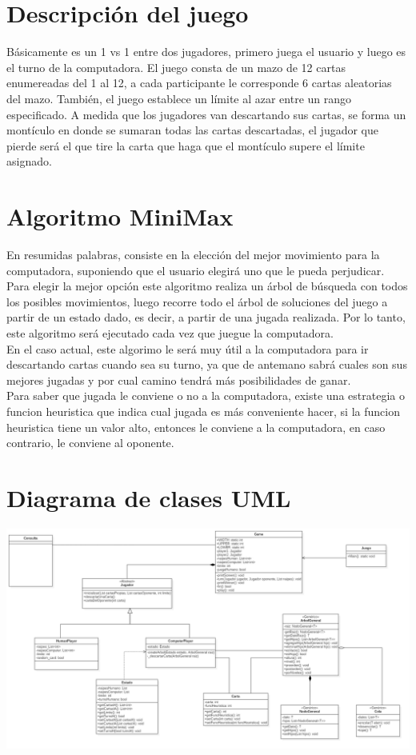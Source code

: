 \documentclass[12pt,a4paper]{article}
\begin{document}
\section{Descripción del juego}
Básicamente es un 1 vs 1 entre dos jugadores, primero juega el usuario y luego es el turno de la computadora. El juego consta de  un mazo de 12 cartas enumereadas del 1 al 12, a cada participante le corresponde 6 cartas aleatorias del mazo. También, el juego establece un límite al azar entre un rango especificado. A medida que los jugadores van descartando sus cartas, se forma un montículo en donde se sumaran todas las cartas descartadas, el jugador que pierde será el que tire la carta que haga que el montículo supere el límite asignado.  

\section{Algoritmo MiniMax}
En resumidas palabras, consiste en la elección del mejor movimiento para la computadora, suponiendo que el usuario elegirá uno que le pueda perjudicar. Para elegir la mejor opción este algoritmo realiza un árbol de búsqueda con todos los posibles movimientos, luego recorre todo el árbol de soluciones del juego a partir de un estado dado, es decir, a partir de una jugada realizada. Por lo tanto, este algoritmo será ejecutado cada vez que juegue la computadora.\\

En el caso actual, este algorimo le será muy útil a la computadora para ir descartando cartas cuando sea su turno, ya que de antemano sabrá cuales son sus mejores jugadas y por cual camino tendrá más posibilidades de ganar.\\

Para saber que jugada le conviene o no a la computadora, existe una estrategia o funcion heuristica que indica cual jugada es más conveniente hacer, si la funcion heuristica tiene un valor alto, entonces le conviene a la computadora, en caso contrario, le conviene al oponente.

\section{Diagrama de clases UML}
\begin{center}
\includegraphics[scale=0.32]{diagrama_UML.png} 
\end{center}
\end{document}
